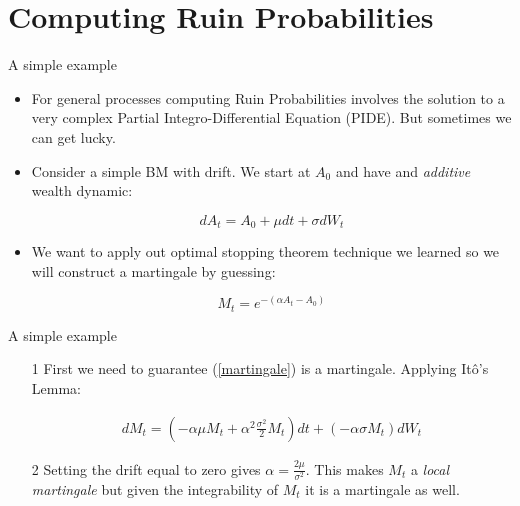 \documentclass[11pt]{beamer}
\begin{document}
\section{Computing Ruin Probabilities}
\begin{frame}{ A simple example } 

\begin{itemize}

\item For general processes computing Ruin Probabilities involves the solution to a very complex Partial Integro-Differential Equation (PIDE). But sometimes we can get lucky.

\vfill

\item Consider a simple BM with drift. We start at $A_0$ and have and \emph{additive} wealth dynamic:

\begin{equation}\label{additive}
dA_t = A_0 + \mu dt + \sigma dW_t 
\end{equation}

\vfill 
\item We want to apply out optimal stopping theorem technique we learned so we will construct a martingale by guessing: 

\begin{equation}\label{martingale}
M_t = e^{ - (\alpha A_t - A_0) }
\end{equation}

\end{itemize}

\end{frame}
\begin{frame}{ A simple example } 
\begin{enumerate}

\item[1] First we need to guarantee (\ref{martingale}) is a martingale. Applying It\^{o}'s Lemma: 

\begin{align*}
dM_t = \left( -\alpha \mu M_t + \alpha^2\frac{ \sigma^2}{2} M_t \right)dt + \left( -\alpha \sigma M_t \right)dW_t
\end{align*}

\vfill

\item[2] Setting the drift equal to zero gives $\alpha=\frac{2\mu}{\sigma^2}$. This makes $M_t$ a \textit{local martingale} but given the integrability of $M_t$ it is a martingale as well. 

\end{enumerate}
\end{frame}
\end{document}
